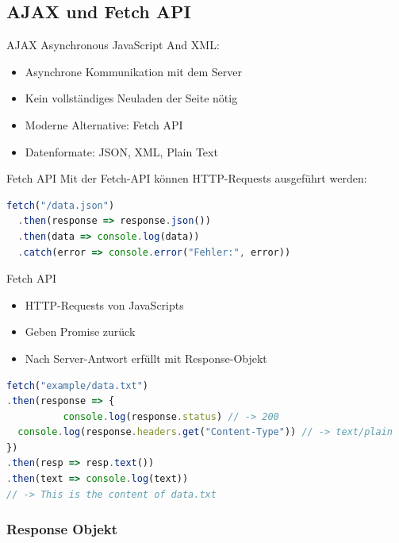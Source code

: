 \pagebreak

\subsection{AJAX und Fetch API}

\begin{concept}{AJAX}
    Asynchronous JavaScript And XML:
    \begin{itemize}
        \item Asynchrone Kommunikation mit dem Server
        \item Kein vollständiges Neuladen der Seite nötig
        \item Moderne Alternative: Fetch API
        \item Datenformate: JSON, XML, Plain Text
    \end{itemize}
\end{concept}

\begin{definition}{Fetch API}
Mit der Fetch-API können HTTP-Requests ausgeführt werden:
\begin{lstlisting}[language=JavaScript, style=basesmol]
fetch("/data.json")
  .then(response => response.json())
  .then(data => console.log(data))
  .catch(error => console.error("Fehler:", error))
\end{lstlisting}
\end{definition}

\begin{definition}{Fetch API}
\begin{itemize}
\item HTTP-Requests von JavaScripts
\item Geben Promise zurück
\item Nach Server-Antwort erfüllt mit Response-Objekt
\end{itemize}
\end{definition}
\begin{lstlisting}[language=JavaScript, style=basesmol]
fetch("example/data.txt")
.then(response => {
          console.log(response.status) // -> 200
  console.log(response.headers.get("Content-Type")) // -> text/plain
})
.then(resp => resp.text())
.then(text => console.log(text))
// -> This is the content of data.txt
\end{lstlisting}

\subsubsection{Response Objekt}

